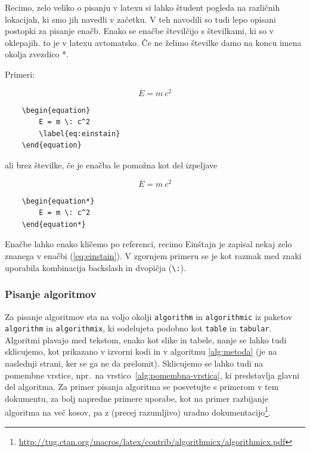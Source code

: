 \documentclass[12pt]{article}
\theoremstyle{definition}
\begin{document}
Recimo, zelo veliko o pisanju v latexu si lahko študent pogleda na različnih lokacijah, ki smo jih navedli v začetku. V teh navodili so tudi lepo opisani postopki za pisanje enačb. Enako se enačbe številčijo s številkami, ki so v oklepajih. to je v latexu avtomatsko. Če ne želimo številke damo na koncu imena okolja zvezdico *.

Primeri:

\begin{equation}
	E = m \: c^2
	\label{eq:einstain}
\end{equation}

\begin{verbatim}
	\begin{equation}
		E = m \: c^2
		\label{eq:einstain}
	\end{equation}
\end{verbatim}

ali brez številke, če je enačba le pomožna kot del izpeljave

\begin{equation*}
	E = m \: c^2
\end{equation*}

\begin{verbatim}
	\begin{equation*}
		E = m \: c^2
	\end{equation*}
\end{verbatim}

Enačbe lahko enako kličemo po referenci, recimo Einštajn je zapisal nekaj zelo znanega v enačbi (\ref{eq:einstain}). V zgornjem primeru se je kot razmak med znaki uporabila kombinacija backslash in dvopičja (\texttt{\textbackslash :}).

\subsubsection{Pisanje algoritmov}
Za pisanje algoritmov sta na voljo okolji \texttt{algorithm} in \texttt{algorithmic} iz paketov \texttt{algorithm} in \texttt{algorithmix}, ki sodelujeta podobno kot \texttt{table} in \texttt{tabular}. Algoritmi plavajo med tekstom, enako kot slike in tabele, nanje se lahko tudi sklicujemo, kot prikazano v izvorni kodi in v algoritmu \ref{alg:metoda} (je na naslednji strani, ker se ga ne da prelomit). Sklicujemo se lahko tudi na pomembne vrstice, npr.\ na vrstico~\ref{alg:pomembna-vrstica}, ki predstavlja glavni del algoritma. Za primer pisanja algoritma se posvetujte s primerom v tem dokumentu, za bolj napredne primere uporabe, kot na primer razbijanje algoritma na več kosov, pa z (precej razumljivo) uradno dokumentacijo\footnote{\url{http://tug.ctan.org/macros/latex/contrib/algorithmicx/algorithmicx.pdf}}.
\end{document}
